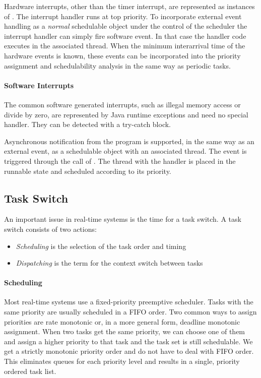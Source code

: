Hardware interrupts, other than the timer interrupt, are represented
as instances of . The interrupt handler runs at top
priority. To incorporate external event handling as a \emph{normal}
schedulable object under the control of the scheduler the interrupt
handler can simply fire software event. In that case the handler code
executes in the associated thread. When the minimum interarrival time
of the hardware events is known, these events can be incorporated
into the priority assignment and schedulability analysis in the same
way as periodic tasks.

\paragraph{Software Interrupts}

The common software generated interrupts, such as illegal memory
access or divide by zero, are represented by Java runtime exceptions
and need no special handler. They can be detected with a try-catch
block.

Asynchronous notification from the program is supported, in the same
way as an external event, as a schedulable object with an associated
thread. The event is triggered through the call of . The
thread with the handler is placed in the runnable state and scheduled
according to its priority.


\subsection{Task Switch}

An important issue in real-time systems is the time for a task
switch. A task switch consists of two actions:
\begin{itemize}
    \item \emph{Scheduling} is the selection of the task order
        and timing
    \item \emph{Dispatching} is the term for the context switch
        between tasks
\end{itemize}

\paragraph{Scheduling}

Most real-time systems use a fixed-priority preemptive scheduler.
Tasks with the same priority are usually scheduled in a FIFO order.
Two common ways to assign priorities are rate monotonic or, in a more
general form, deadline monotonic assignment. When two tasks get the
same priority, we can choose one of them and assign a higher priority
to that task and the task set is still schedulable. We get a strictly
monotonic priority order and do not have to deal with FIFO order.
This eliminates queues for each priority level and results in a
single, priority ordered task list.

